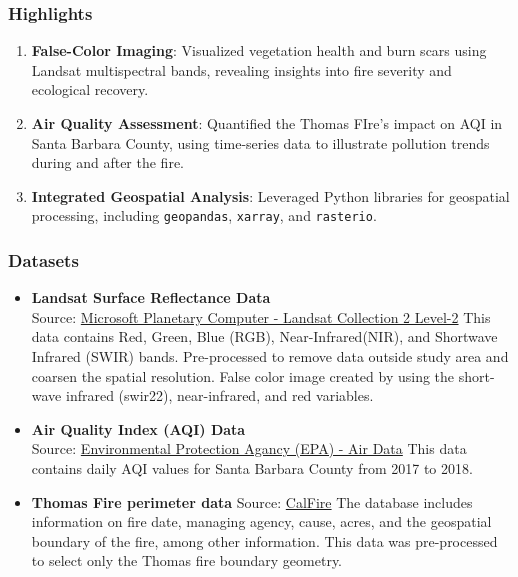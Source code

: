\documentclass[
  letterpaper,
  DIV=11,
  numbers=noendperiod]{scrartcl}
\begin{document}
\hypertarget{highlights}{%
\subsubsection{Highlights}\label{highlights}}

\begin{enumerate}
\def\labelenumi{\arabic{enumi}.}
\item
  \textbf{False-Color Imaging}: Visualized vegetation health and burn
  scars using Landsat multispectral bands, revealing insights into fire
  severity and ecological recovery.
\item
  \textbf{Air Quality Assessment}: Quantified the Thomas FIre's impact
  on AQI in Santa Barbara County, using time-series data to illustrate
  pollution trends during and after the fire.
\item
  \textbf{Integrated Geospatial Analysis}: Leveraged Python libraries
  for geospatial processing, including \texttt{geopandas},
  \texttt{xarray}, and \texttt{rasterio}.
\end{enumerate}

\hypertarget{datasets}{%
\subsubsection{Datasets}\label{datasets}}

\begin{itemize}
\item
  \textbf{Landsat Surface Reflectance Data}\\
  Source:
  \href{https://planetarycomputer.microsoft.com/dataset/landsat-c2-l2}{Microsoft
  Planetary Computer - Landsat Collection 2 Level-2} This data contains
  Red, Green, Blue (RGB), Near-Infrared(NIR), and Shortwave Infrared
  (SWIR) bands. Pre-processed to remove data outside study area and
  coarsen the spatial resolution. False color image created by using the
  short-wave infrared (swir22), near-infrared, and red variables.
\item
  \textbf{Air Quality Index (AQI) Data}\\
  Source:
  \href{https://www.epa.gov/outdoor-air-quality-data}{Environmental
  Protection Agancy (EPA) - Air Data} This data contains daily AQI
  values for Santa Barbara County from 2017 to 2018.
\item
  \textbf{Thomas Fire perimeter data} Source:
  \href{https://www.fire.ca.gov/what-we-do/fire-resource-assessment-program/fire-perimeters}{CalFire}
  The database includes information on fire date, managing agency,
  cause, acres, and the geospatial boundary of the fire, among other
  information. This data was pre-processed to select only the Thomas
  fire boundary geometry.
\end{itemize}
\end{document}
